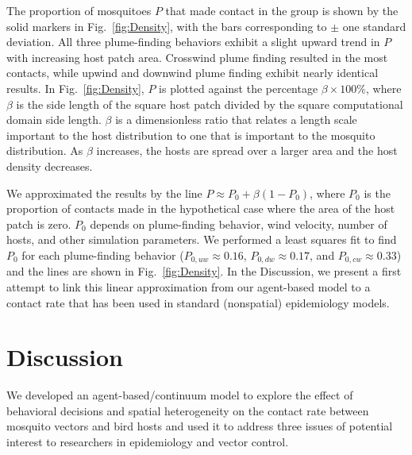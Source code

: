 \documentclass[10pt]{article}
\newif\ifnotesw
\newcommand{\notes}[1]{\ifnotesw  $\bullet$\ \textit{ \textbf{#1}}\ $\bullet$ \fi}
\begin{document}
The proportion of mosquitoes $P$ that made contact in the group is shown by the solid markers in Fig.~\ref{fig:Density}, with the bars corresponding to $\pm$ one standard deviation. 
All three plume-finding behaviors exhibit a slight upward trend in $P$ with increasing host patch area. Crosswind plume finding resulted in the most contacts, while upwind and downwind plume finding exhibit nearly identical results. 
In Fig.~\ref{fig:Density}, $P$ is plotted against the percentage $\beta \times 100\%$, where $\beta$ is the side length of the square host patch divided by the square computational domain side length. $\beta$ is a dimensionless ratio that relates a length scale important to the host distribution to one that is important to the mosquito distribution. As $\beta$ increases, the hosts are spread over a larger area and the host density decreases.

We approximated the results by the line $P  \approx P_0 + \beta(1-P_0)$, where $P_0$ is the proportion of contacts made in the hypothetical case where the area of the host patch is zero. $P_0$ depends on plume-finding behavior, wind velocity, number of hosts, and other simulation parameters. We performed a least squares fit to find $P_0$ for each plume-finding behavior ($P_{0,uw} \approx 0.16$, $P_{0,dw} \approx 0.17$, and $P_{0,cw} \approx 0.33$) and the lines are shown in Fig.~\ref{fig:Density}. 
In the Discussion, we present a first attempt to link this linear approximation from our agent-based model to a contact rate that has been used in standard (nonspatial) epidemiology models. 


\section*{Discussion}\label{sec:summary}
	 	We developed an agent-based/continuum model
to explore the effect of behavioral decisions and spatial heterogeneity on the contact
rate between mosquito vectors and bird hosts and used it to address three issues of potential interest to researchers in epidemiology and vector control. 
\end{document}
